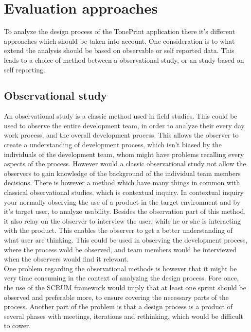 \section{Evaluation approaches}
\label{AnalyzingTonePrintDesign}
To analyze the design process of the TonePrint application there it's different approaches which should be taken into account. One consideration is to what extend the analysis should be based on observable or self reported data. This leads to a choice of method between a observational study, or an study based on self reporting. 


\subsection*{Observational study}
\label{MethodObservation}
An observational study is a classic method used in field studies. This could be used to observe the entire development team, in order to analyze their every day work process, and the overall development process. This allows the observer to create a understanding of development process, which isn't biased by the individuals of the development team, whom might have problems recalling every aspects of the process. However would a classic observational study not allow the observers to gain knowledge of the background of the individual team members decisions. There is however a method which have many things in common with classical observational studies, which is contextual inquiry. In contextual inquiry your normally observing the use of a product in the target environment and by it's target user, to analyze usability. Besides the observation part of this method, it also relay on the observer to interview the user, while he or she is interacting with the product. This enables the observer to get a better understanding of what user are thinking. This could be used in observing the development process, where the process wold be observed, and team members would be interviewed when the observers would find it relevant. \\
One problem regarding the observational methods is however that it might be very time consuming in the context of analyzing the design process. Fore once, the use of the SCRUM framework would imply that at least one sprint should be observed and preferable more, to ensure covering the necessary parts of the process. Another part of the problem is that a design process is a product of several phases with meetings, iterations and rethinking, which would be difficult to cower.


